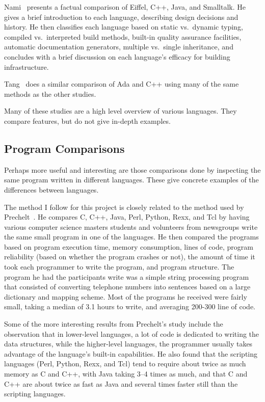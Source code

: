 \documentclass{article}
\begin{document}
Nami~\cite{NamiCompOOSoftEng} presents a factual comparison of Eiffel, C++, Java, and
Smalltalk.  He gives a brief introduction to each
language, describing design decisions and history.  He then classifies each
language based on static vs.~dynamic typing, compiled vs.~interpreted build
methods, built-in quality assurance facilities, automatic documentation
generators, multiple vs.~single inheritance, and concludes with a brief
discussion on each language's efficacy for building infrastructure.

Tang~\cite{TangAdaVsCpp} does a similar comparison of Ada and C++ using many of
the same methods as the other studies.

Many of these studies are a high level overview of various languages.  They
compare features, but do not give in-depth examples.

\subsection{Program Comparisons}

Perhaps more useful and interesting are those comparisons done by inspecting
the same program written in different languages.  These give concrete examples
of the differences between languages.

The method I follow for this project is closely related to the method used by
Prechelt~\cite{Prechelt7LangComp}.  He compares C, C++, Java, Perl, Python,
Rexx, and Tcl by having various computer science masters students and
volunteers from newsgroups write the same small program in one of the
languages.  He then compared the programs based on program execution
time, memory consumption, lines of code, program reliability (based on whether
the program crashes or not), the amount of time it took each programmer to
write the program, and program structure.  The program he had the participants
write was a simple string processing program that consisted of converting
telephone numbers into sentences based on a large dictionary and mapping
scheme.  Most of the programs he received were fairly small, taking a median of
3.1 hours to write, and averaging 200-300 line of code.

Some of the more interesting results from Prechelt's study include the
observation that in lower-level languages, a lot of code is dedicated to
writing the data structures, while the higher-level languages, the programmer
usually takes advantage of the language's built-in capabilities.  He also found
that the scripting languages (Perl, Python, Rexx, and Tcl) tend to require
about twice as much memory as C and C++, with Java taking 3--4 times as much,
and that C and C++ are about twice as fast as Java and several times faster
still than the scripting languages.
\end{document}
